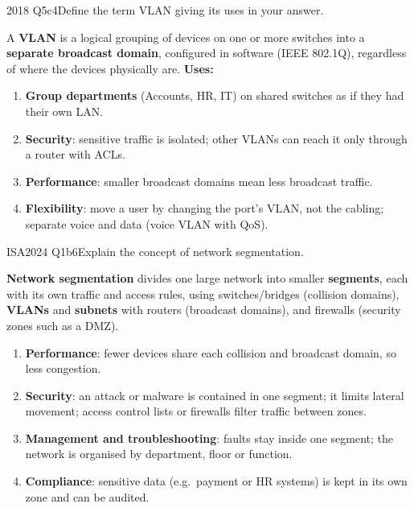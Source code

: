 \documentclass[10pt]{article}
\begin{document}
\begin{pastq}{2018 Q5c}{4}Define the term VLAN giving its uses in your answer.\end{pastq}
\begin{ans}
A \textbf{VLAN} is a logical grouping of devices on one or more switches into a \textbf{separate broadcast domain}, configured in software (IEEE 802.1Q), regardless of where the devices physically are.
\textbf{Uses:}
\begin{enumerate}
\item \textbf{Group departments} (Accounts, HR, IT) on shared switches as if they had their own LAN.
\item \textbf{Security}: sensitive traffic is isolated; other VLANs can reach it only through a router with ACLs.
\item \textbf{Performance}: smaller broadcast domains mean less broadcast traffic.
\item \textbf{Flexibility}: move a user by changing the port's VLAN, not the cabling; separate voice and data (voice VLAN with QoS).
\end{enumerate}
\end{ans}

\begin{pastq}{ISA2024 Q1b}{6}Explain the concept of network segmentation.\end{pastq}
\begin{ans}
\textbf{Network segmentation} divides one large network into smaller \textbf{segments}, each with its own traffic and access rules, using switches/bridges (collision domains), \textbf{VLANs} and \textbf{subnets} with routers (broadcast domains), and firewalls (security zones such as a DMZ).
\begin{enumerate}
\item \textbf{Performance}: fewer devices share each collision and broadcast domain, so less congestion.
\item \textbf{Security}: an attack or malware is contained in one segment; it limits lateral movement; access control lists or firewalls filter traffic between zones.
\item \textbf{Management and troubleshooting}: faults stay inside one segment; the network is organised by department, floor or function.
\item \textbf{Compliance}: sensitive data (e.g.\ payment or HR systems) is kept in its own zone and can be audited.
\end{enumerate}
\end{ans}
\end{document}
